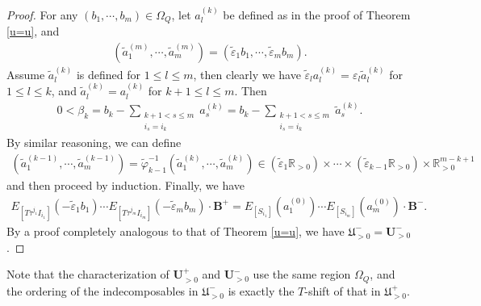 \documentclass[12pt]{amsart}
\begin{document}
\begin{proof}
    For any $(b_1,\cdots,b_m)\in \Omega_Q$, let $a_l^{(k)}$ be defined as in the proof of Theorem \ref{u=u}, and 
    \begin{align*}
        (\tilde{a}_1^{(m)},\cdots,\tilde{a}_m^{(m)})=(\tilde{\varepsilon}_1b_1,\cdots,\tilde{\varepsilon}_mb_m).
    \end{align*}
    Assume $\tilde{a}_l^{(k)}$ is defined for $1\leq l\leq m$, then clearly we have $\tilde{\varepsilon}_l a_l^{(k)}=\varepsilon_l \tilde{a}_l^{(k)}$ for $1\leq l\leq k$, and $\tilde{a}_l^{(k)}=a_l^{(k)}$ for $k+1\leq l \leq m$.
    Then 
    \begin{align*}
        0<\beta_k=b_k-\sum_{\substack{k+1<s\leq m\\i_s=i_k}}a_s^{(k)}=b_k-\sum_{\substack{k+1<s\leq m\\i_s=i_k}}\tilde{a}_s^{(k)}.
    \end{align*}
    By similar reasoning, we can define 
    \begin{align*}
        (\tilde{a}_1^{(k-1)},\cdots,\tilde{a}_m^{(k-1)})=\tilde{\varphi}_{k-1}^{-1}(\tilde{a}_1^{(k)},\cdots,\tilde{a}_m^{(k)})\in (\tilde{\varepsilon}_1\mathbb{R}_{>0})\times \cdots \times (\tilde{\varepsilon}_{k-1}\mathbb{R}_{>0})\times \mathbb{R}_{>0}^{m-k+1}
    \end{align*}
    and then proceed by induction.
    Finally, we have 
    \begin{align*}
        E_{[T\tau^{j_1}I_{i_1}]}(-\tilde{\varepsilon}_1b_1)\cdots  E_{[T\tau^{j_m}I_{i_m}]}(-\tilde{\varepsilon}_mb_m) \cdot \mathbf{B}^+ = E_{[S_{i_1}]}(a_1^{(0)})\cdots E_{[S_{i_m}]}(a_m^{(0)}) \cdot \mathbf{B}^-.
    \end{align*}
    By a proof completely analogous to that of Theorem \ref{u=u}, we have $\mathfrak{U}^-_{>0}=\mathbf{U}^-_{>0}$.
\end{proof}

Note that the characterization of $\mathbf{U}^+_{>0}$ and $\mathbf{U}^-_{>0}$ use the same region $\Omega_Q$, and the ordering of the indecomposables in $\mathfrak{U}^-_{>0}$ is exactly the $T$-shift of that in $\mathfrak{U}^+_{>0}$.
\end{document}
